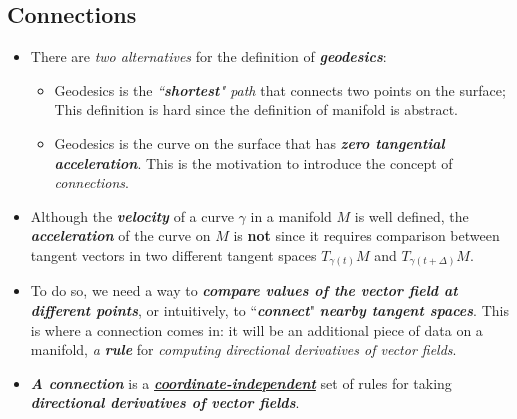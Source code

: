 \documentclass[11pt]{article}
\begin{document}
\subsection{Connections}
\begin{itemize}
\item \begin{remark}
There are \emph{two alternatives} for the definition of \emph{\textbf{geodesics}}:
\begin{itemize}
\item Geodesics is the \emph{``\textbf{shortest}" path} that connects two points on the surface; This definition is hard since the definition of manifold is abstract. 
\item Geodesics is the curve on the surface that has \emph{\textbf{zero tangential acceleration}}. This is the motivation to introduce the concept of \emph{connections}.
\end{itemize} 
\end{remark}

\item \begin{remark}
Although the \emph{\textbf{velocity}} of a curve $\gamma$ in a manifold $M$ is well defined, the \emph{\textbf{acceleration}} of the curve on $M$ is \textbf{not} since it requires comparison between tangent vectors in two different tangent spaces $T_{\gamma(t)}M$ and $T_{\gamma(t+\Delta)}M$.
\end{remark}

\item \begin{remark}
To do so, we need a way to \emph{\textbf{compare values of the vector field at different points}}, or intuitively, to ``\emph{\textbf{connect}}" \emph{\textbf{nearby tangent spaces}}. This is where a connection comes in: it will be an additional piece of data on a manifold, \emph{a \textbf{rule}} for \emph{computing directional derivatives of vector fields}.
\end{remark}

\item \begin{remark}
\emph{\textbf{A connection}} is a \underline{\emph{\textbf{coordinate-independent}}} set of rules for taking \emph{\textbf{directional derivatives of vector fields}}.
\end{remark}


\end{itemize}
\end{document}
